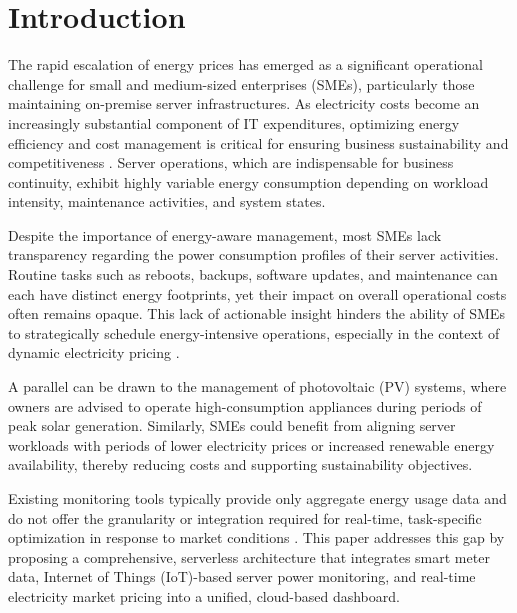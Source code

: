 
\section{Introduction}
\label{introduction:introduction}
The rapid escalation of energy prices has emerged as a significant operational challenge for small and medium-sized enterprises (SMEs), particularly those maintaining on-premise server infrastructures. As electricity costs become an increasingly substantial component of IT expenditures, optimizing energy efficiency and cost management is critical for ensuring business sustainability and competitiveness \cite{gennitsaris2023sme,ec2022energyefficiencysmes}. Server operations, which are indispensable for business continuity, exhibit highly variable energy consumption depending on workload intensity, maintenance activities, and system states.

Despite the importance of energy-aware management, most SMEs lack transparency regarding the power consumption profiles of their server activities. Routine tasks such as reboots, backups, software updates, and maintenance can each have distinct energy footprints, yet their impact on overall operational costs often remains opaque. This lack of actionable insight hinders the ability of SMEs to strategically schedule energy-intensive operations, especially in the context of dynamic electricity pricing \cite{ristic2021iotenergymanagement}.

A parallel can be drawn to the management of photovoltaic (PV) systems, where owners are advised to operate high-consumption appliances during periods of peak solar generation. Similarly, SMEs could benefit from aligning server workloads with periods of lower electricity prices or increased renewable energy availability, thereby reducing costs and supporting sustainability objectives.

Existing monitoring tools typically provide only aggregate energy usage data and do not offer the granularity or integration required for real-time, task-specific optimization in response to market conditions \cite{ristic2021iotenergymanagement}. This paper addresses this gap by proposing a comprehensive, serverless architecture that integrates smart meter data, Internet of Things (IoT)-based server power monitoring, and real-time electricity market pricing into a unified, cloud-based dashboard.

